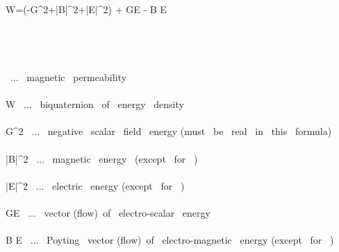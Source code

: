 \mu  \widehat W=(-G^2+|\vec B|^2+|\vec E|^2) +\imath {} G\vec E - \imath {} \vec B \times \vec E \\\\\\

\\\\

\mu \ ... \ magnetic \ permeability \\\\
\widehat W \ ... \ biquaternion \ of \ energy \ density \\\\
G^2 \ ... \  negative \ scalar \ field \ energy (must \ be \ real \ in \ this \  formula)\\\\
|\vec B|^2 \ ... \ magnetic \ energy \ (except \ for \ \mu) \\\\
|\vec E|^2 \ ... \ electric \ energy (except \ for \ \mu) \\\\
 G\vec E \ ... \ vector (flow)\ of \ electro-scalar \ energy \\\\
 \vec B \times \vec E \ ... \ Poyting \ vector (flow)\ of \ electro-magnetic \ energy (except \ for \ \mu)
